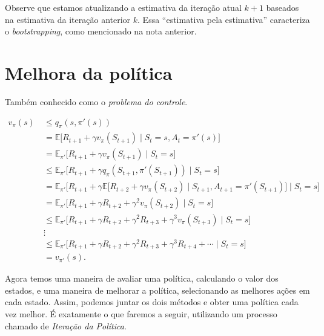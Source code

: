 \documentclass{article}
\begin{document}
            Observe que estamos atualizando a estimativa da iteração atual $k+1$ baseados na estimativa da iteração anterior $k$. Essa ``estimativa pela estimativa'' caracteriza o \emph{bootstrapping}, como mencionado na nota anterior.
        
    \section{Melhora da política}
    
        Também conhecido como o \textit{problema do controle}.
        
        \begin{equation}
            \label{eq:policy-improvement-theorem}
            \begin{split}
                v_{\pi}(s) 
                    & \ \le q_{\pi}(s, \pi'(s)) \\
                    & \ = \mathbb{E} \big[ R_{t+1} + \gamma v_{\pi}(S_{t+1}) \mid S_t = s, A_t = \pi'(s) \big] \\
                    & \ = \mathbb{E}_{\pi'} \big[ R_{t+1} + \gamma v_{\pi}(S_{t+1}) \mid S_t = s \big] \\
                    & \ \le \mathbb{E}_{\pi'} \big[ R_{t+1} + \gamma q_{\pi}(S_{t+1}, \pi'(S_{t+1})) \mid S_t = s \big] \\
                    & \ = \mathbb{E}_{\pi'} \Big[ R_{t+1} + \gamma \mathbb{E} \big[ R_{t+2} + \gamma v_{\pi} (S_{t+2}) \mid S_{t+1}, A_{t+1} = \pi'(S_{t+1}) \big] \mid S_t = s \Big] \\
                    & \ = \mathbb{E}_{\pi'} \big[ R_{t+1} + \gamma R_{t+2} + \gamma^2 v_{\pi}(S_{t+2}) \mid S_t = s \big] \\
                    & \ \le \mathbb{E}_{\pi'} \big[ R_{t+1} + \gamma R_{t+2} + \gamma^2 R_{t+3} + \gamma^3 v_{\pi}(S_{t+3}) \mid S_t = s \big] \\
                    & \ \vdots \\
                    & \ \le \mathbb{E}_{\pi'} \big[ R_{t+1} + \gamma R_{t+2} + \gamma^2 R_{t+3} + \gamma^3 R_{t+4} + \cdots \mid S_t = s \big] \\
                    & \ = v_{\pi'}(s) .
            \end{split}
        \end{equation}
    
        Agora temos uma maneira de avaliar uma política, calculando o valor dos estados, e uma maneira de melhorar a política, selecionando as melhores ações em cada estado. Assim, podemos juntar os dois métodos e obter uma política cada vez melhor. É exatamente o que faremos a seguir, utilizando um processo chamado de \emph{Iteração da Política}.
    
\end{document}
